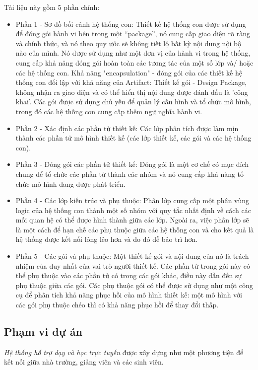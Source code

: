 \documentclass[./../main_file.tex]{subfiles}
\begin{document}
Tài liệu này gồm 5 phần chính:
\begin{itemize}
	\item Phần 1 - Sơ đồ bối cảnh hệ thống con: Thiết kế hệ thống con được sử dụng để đóng gói hành vi bên trong một “package”, nó cung cấp giao diện rõ ràng và chính thức, và nó theo quy ước sẽ không tiết lộ bất kỳ nội dung nội bộ nào của mình. Nó được sử dụng như một đơn vị của hành vi trong hệ thống, cung cấp khả năng đóng gói hoàn toàn các tương tác của một số lớp và/ hoặc các hệ thống con. Khả năng "encapsulation" - đóng gói của các thiết kế hệ thống con đối lập với khả năng của Artifact: Thiết kế gói - Design Package, không nhận ra giao diện và có thể hiển thị nội dung được đánh dấu là 'công khai'. Các gói được sử dụng chủ yếu để quản lý cấu hình và tổ chức mô hình, trong đó các hệ thống con cung cấp thêm ngữ nghĩa hành vi. 
	\item Phần 2 - Xác định các phần tử thiết kế: Các lớp phân tích được làm mịn thành các phần tử mô hình thiết kế (các lớp thiết kế, các gói và các hệ thống con).
	\item Phần 3 - Đóng gói các phần tử thiết kế: Đóng gói là một cơ chế có mục đích chung để tổ chức các phần tử thành các nhóm và nó cung cấp khả năng tổ chức mô hình đang được phát triển. 
	\item Phần 4 - Các lớp kiến trúc và phụ thuộc: Phân lớp cung cấp một phân vùng logic của hệ thống con thành một số nhóm với quy tắc nhất định về cách các mối quan hệ có thể được hình thành giữa các lớp. Ngoài ra, việc phân lớp sẽ là một cách để hạn chế các phụ thuộc giữa các hệ thống con và cho kết quả là hệ thống được kết nối lỏng lẻo hơn và do đó dễ bảo trì hơn.
	\item Phần 5 - Các gói và phụ thuộc: Một thiết kế gói và nội dung của nó là trách nhiệm của duy nhất của vai trò người thiết kế. Các phần tử trong gói này có thể phụ thuộc vào các phần tử có trong các gói khác, điều này dẫn đến sự phụ thuộc giữa các gói. Các phụ thuộc gói có thể được sử dụng như một công cụ để phân tích khả năng phục hồi của mô hình thiết kế: một mô hình với các gói phụ thuộc chéo thì có khả năng phục hồi để thay đổi thấp.
\end{itemize}

\subsection{Phạm vi dự án}

\textit{Hệ thống hỗ trợ dạy và học trực tuyến} được xây dựng như một phương tiện để kết nối giữa nhà trường, giảng viên và các sinh viên.
\end{document}
